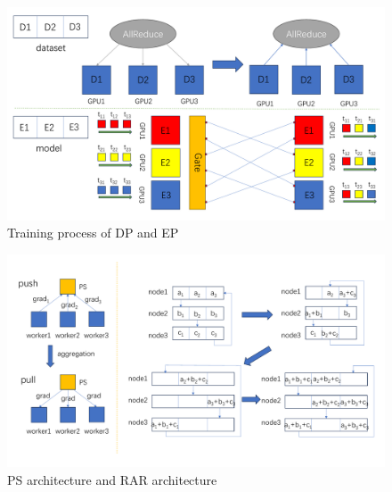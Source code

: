 \documentclass[conference]{IEEEtran}
\begin{document}
\begin{figure}
	\centering
	\includegraphics[width=1\linewidth]{figure/picture4}
	\caption{Training process of DP and EP}
	\label{fig:picture4}
\end{figure}

\begin{figure}
	\centering
	\includegraphics[width=1\linewidth]{figure/picture5}
	\caption{PS architecture and RAR architecture}
	\label{fig:picture5}
\end{figure}
\end{document}
